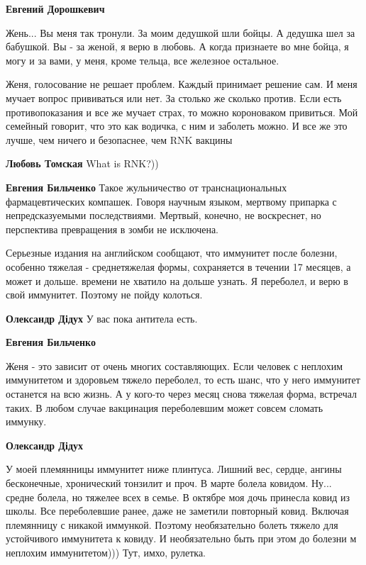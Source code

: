 \begin{itemize}
\begin{itemize}
\textbf{Евгений Дорошкевич} 

Жень... Вы меня так тронули. За моим дедушкой шли бойцы. А дедушка шел за
бабушкой. Вы - за женой, я верю в любовь. А когда признаете во мне бойца, я
могу и за вами, у меня, кроме тельца, все железное остальное.

\end{itemize} %


Женя, голосование не решает проблем. Каждый принимает решение сам. И меня
мучает вопрос прививаться или нет. За столько же сколько против. Если есть
противопоказания и все же мучает страх, то можно короноваком привиться. Мой
семейный говорит, что это как водичка, с ним и заболеть можно. И все же это
лучше, чем ничего и безопаснее, чем RNK вакцины

\begin{itemize} %
\textbf{Любовь Томская} What is RNK?))

\textbf{Евгения Бильченко} Такое жульничество от транснациональных фармацевтических компашек. Говоря научным языком, мертвому припарка с непредсказуемыми последствиями. Мертвый, конечно, не воскреснет, но перспектива превращения в зомби не исключена.
\end{itemize} %


Серьезные издания на английском сообщают, что иммунитет после болезни, особенно
тяжелая - среднетяжелая формы, сохраняется в течении 17 месяцев, а может и
дольше. времени не хватило на дольше узнать. Я переболел, и верю в свой
иммунитет. Поэтому не пойду колоться.

\begin{itemize} %
\textbf{Олександр Дідух} У вас пока антитела есть.

\textbf{Евгения Бильченко} 

Женя - это зависит от очень многих составляющих. Если человек с неплохим
иммунитетом и здоровьем тяжело переболел, то есть шанс, что у него иммунитет
останется на всю жизнь. А у кого-то через месяц снова тяжелая форма, встречал
таких. В любом случае вакцинация переболевшим может совсем сломать иммунку.

\textbf{Олександр Дідух} 

У моей племянницы иммунитет ниже плинтуса. Лишний вес, сердце, ангины
бесконечные, хронический тонзилит и проч. В марте болела ковидом. Ну... средне
болела, но тяжелее всех в семье. В октябре моя дочь принесла ковид из школы.
Все переболевшие ранее, даже не заметили повторный ковид. Включая племянницу с
никакой иммункой. Поэтому необязательно болеть тяжело для устойчивого
иммунитета к ковиду. И необязательно быть при этом до болезни м неплохим
иммунитетом))) Тут, имхо, рулетка.


\end{itemize}
\end{itemize}
